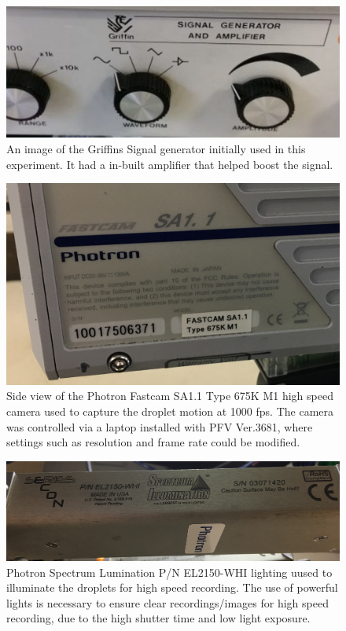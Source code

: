 \begin{figure}[ht]
\includegraphics[width=12cm]{prototype/exp_rep_imgs/griffinsSigGen.jpg}
\centering
\caption{An image of the Griffins Signal generator initially used in this experiment. It had a in-built amplifier that helped boost the signal.}
\centering
\label{fig:griffinsSigGen}
\end{figure}

\begin{figure}[ht]
\includegraphics[width=12cm]{prototype/exp_rep_imgs/PhotronHighSpeedCamera.jpg}
\centering
\caption{Side view of the Photron Fastcam SA1.1 Type 675K M1 high speed camera used to capture the droplet motion at 1000 fps. The camera was controlled via a laptop installed with PFV Ver.3681, where settings such as resolution and frame rate could be modified.}
\centering
\label{fig:PhotronCamera}
\end{figure}

\begin{figure}[ht]
\includegraphics[width=12cm]{prototype/exp_rep_imgs/PhotronLighting.jpg}
\centering
\caption{Photron Spectrum Lumination P/N EL2150-WHI lighting uused to illuminate the droplets for high speed recording. The use of powerful lights is necessary to ensure clear recordings/images for high speed recording, due to the high shutter time and low light exposure.}
\centering
\label{fig:PhotronLighting}
\end{figure}

